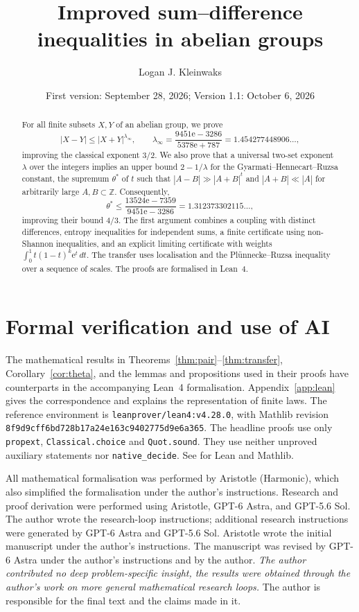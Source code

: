 \documentclass[11pt]{amsart}
\title[Improved sum--difference inequalities]{Improved sum--difference inequalities in abelian groups}
\author{Logan J. Kleinwaks}
\date{First version: September 28, 2026; Version 1.1: October 6, 2026}
\theoremstyle{definition}
\theoremstyle{remark}
\numberwithin{equation}{section}
\newcommand{\Z}{\mathbb{Z}}
\newcommand{\e}{\mathrm{e}}
\newcommand{\lamI}{\lambda_\infty}
\begin{document}
\begin{abstract}
For all finite subsets $X,Y$ of an abelian group, we prove
\[
 |X-Y|\le |X+Y|^{\lamI},\qquad
 \lamI=\frac{9451\e-3286}{5378\e+787}=1.454277448906\ldots,
\]
improving the classical exponent $3/2$. We also prove that a universal
two-set exponent $\lambda$ over the integers implies an upper bound
$2-1/\lambda$ for the Gyarmati--Hennecart--Ruzsa constant, the supremum $\theta^*$ of $t$ such that $|A-B|\gg|A+B|^t$ and $|A+B|\ll|A|$ for arbitrarily large $A,B\subset\Z$.
Consequently,
\[
 \theta^*\le\frac{13524\e-7359}{9451\e-3286}=1.312373302115\ldots,
\]
improving their bound $4/3$. The first argument combines a coupling with
distinct differences, entropy inequalities for independent sums, a finite
certificate using non-Shannon inequalities, and an explicit limiting
certificate with weights $\int_0^1t(1-t)^k\e^t\,dt$. The transfer uses
localisation and the Pl\"unnecke--Ruzsa inequality over a sequence of scales.
The proofs are formalised in Lean~4.
\end{abstract}

\maketitle

\section{Formal verification and use of AI}
The mathematical results in Theorems~\ref{thm:pair}--\ref{thm:transfer},
Corollary~\ref{cor:theta}, and the lemmas and propositions used in
their proofs have counterparts in the accompanying Lean~4
formalisation. Appendix~\ref{app:lean} gives the correspondence and
explains the representation of finite laws. The reference environment
is \texttt{leanprover/lean4:v4.28.0}, with Mathlib revision
\texttt{8f9d9cff6bd728b17a24e163c9402775d9e6a365}.
The headline proofs use only \texttt{propext},
\texttt{Classical.choice} and \texttt{Quot.sound}.
They use neither unproved auxiliary statements nor
\texttt{native\_\allowbreak{}decide}. See \cite{Lean,Mathlib} for Lean and Mathlib.

All mathematical formalisation was performed by Aristotle
(Harmonic), which also simplified the formalisation under the
author's instructions. Research and proof derivation were performed
using Aristotle, GPT-6 Astra, and GPT-5.6 Sol. The author wrote the
research-loop instructions; additional research instructions were
generated by GPT-6 Astra and GPT-5.6 Sol. Aristotle wrote the initial
manuscript under the author's instructions. The manuscript was
revised by GPT-6 Astra under the author's instructions and by the
author. \emph{The author contributed no deep problem-specific insight, the results were obtained through the author's work on more general mathematical research loops.} The author is responsible for the final text and the claims
made in it.
\end{document}
